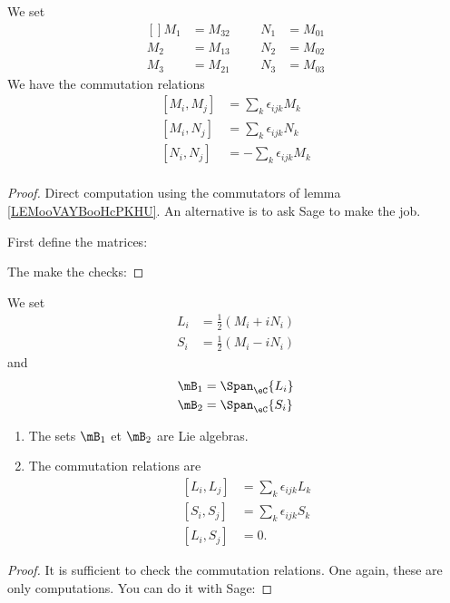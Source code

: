 \begin{lemma}
	We set
	\begin{equation}
		\begin{aligned}[]
			M_1 & =M_{32} &  &  & N_1 & =M_{01} \\
			M_2 & =M_{13} &  &  & N_2 & =M_{02} \\
			M_3 & =M_{21} &  &  & N_3 & =M_{03}
		\end{aligned}
	\end{equation}
	We have the commutation relations
	\begin{subequations}
		\begin{align}
			[M_i,M_j] & =\sum_k\epsilon_{ijk}M_k  \\
			[M_i,N_j] & =\sum_k\epsilon_{ijk}N_k  \\
			[N_i,N_j] & =-\sum_k\epsilon_{ijk}M_k \\
		\end{align}
	\end{subequations}
\end{lemma}

\begin{proof}
	Direct computation using the commutators of lemma \ref{LEMooVAYBooHcPKHU}. An alternative is to ask Sage\cite{Sage} to make the job.

	First define the matrices:
	

	The make the checks:
	
\end{proof}


\begin{lemma}
	We set
	\begin{subequations}
		\begin{align}
			L_i & =\frac{ 1 }{2}(M_i+iN_i) \\
			S_i & =\frac{ 1 }{2}(M_i-iN_i)
		\end{align}
	\end{subequations}
	and
	\begin{subequations}
		\begin{align}
			\mB_1 & =\Span_{\eC}\{ L_i \} \\
			\mB_2 & =\Span_{\eC}\{ S_i \}
		\end{align}
	\end{subequations}
	\begin{enumerate}
		\item
		      The sets \( \mB_1\) et \( \mB_2\) are Lie algebras.
		\item
		      The commutation relations are
		      \begin{subequations}
			      \begin{align}
				      [L_i,L_j] & =\sum_k\epsilon_{ijk}L_k   \\
				      [S_i,S_j] & =\sum_{k}\epsilon_{ijk}S_k \\
				      [L_i,S_j] & =0.
			      \end{align}
		      \end{subequations}
	\end{enumerate}
\end{lemma}

\begin{proof}
	It is sufficient to check the commutation relations. One again, these are only computations. You can do it with Sage:
	
\end{proof}
